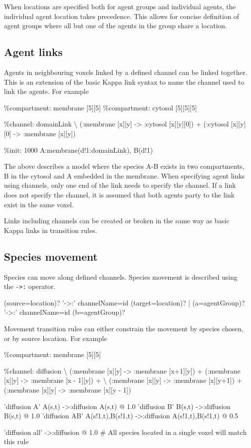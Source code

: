 When locations are specified both for agent groups and individual agents, the individual agent location takes precedence. This allows for concise definition of agent groups where all but one of the agents in the group share a location.

\subsection{Agent links}

Agents in neighbouring voxels linked by a defined channel can be linked together. This is an extension of the basic Kappa link syntax to name the channel used to link the agents. For example

\begin{kappasource}
\%compartment: membrane [5][5]
\%compartment: cytosol [5][5][5]

\%channel: domainLink {\textbackslash}
    (:membrane [x][y] -> :cytosol [x][y][0]) + (:cytosol [x][y][0] -> :membrane [x][y])

\%init: 1000 A:membrane(d!1:domainLink), B(d!1)
\end{kappasource}

The above describes a model where the species A-B exists in two compartments, B in the cytosol and A embedded in the membrane. When specifying agent links using channels, only one end of the link needs to specify the channel. If a link does not specify the channel, it is assumed that both agents party to the link exist in the same voxel.

Links including channels can be created or broken in the same way as basic Kappa links in transition rules.

\subsection{Species movement}

Species can move along defined channels. Species movement is described using the \verb|->:| operator.
\begin{bnfsource}
(source=location)? '->:' channelName=id (target=location)?
| (a=agentGroup)? '->:' channelName=id (b=agentGroup)?
\end{bnfsource}

Movement transition rules can either constrain the movement by species chosen, or by source location. For example

\begin{kappasource}
\%compartment: membrane [5][5]

\%channel: diffusion {\textbackslash}
    (:membrane [x][y] -> :membrane [x+1][y]) + (:membrane [x][y] -> :membrane [x - 1][y]) + {\textbackslash}
    (:membrane [x][y] -> :membrane [x][y+1]) + (:membrane [x][y] -> :membrane [x][y - 1])

'diffusion A' A(s,t) ->:diffusion A(s,t) @ 1.0
'diffusion B' B(s,t) ->:diffusion B(s,t) @ 1.0
'diffusion AB' A(s!1,t),B(s!1,t) ->:diffusion A(s!1,t),B(s!1,t) @ 0.5

'diffusion all' ->:diffusion @ 1.0 # All species located in a single voxel will match this rule
\end{kappasource}

